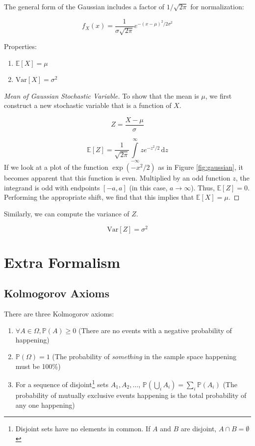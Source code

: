 \documentclass[13pt,oneside]{tufte-book}
\providecommand{\tightlist}{%
  \setlength{\itemsep}{0pt}\setlength{\parskip}{0pt}}
\theoremstyle{definition}
\theoremstyle{definition}
\theoremstyle{definition}
\theoremstyle{remark}
\let\BeginKnitrBlock\begin \let\EndKnitrBlock\end
\begin{document}
The general form of the Gaussian includes a factor of \(1/\sqrt{2\pi}\)
for normalization:

\[
f_X(x) = \frac{1}{\sigma\sqrt{2\pi}}e^{-(x-\mu)^2/2\sigma^2}
\]

Properties:

\begin{enumerate}
\def\labelenumi{\arabic{enumi}.}
\tightlist
\item
  \(\mathbb{E}[X] = \mu\)
\item
  \(\mathrm{Var}[X] = \sigma^2\)
\end{enumerate}

\BeginKnitrBlock{proof}[Mean of Gaussian Stochastic Variable]
{} To
show that the mean is \(\mu\), we first construct a new stochastic
variable that is a function of \(X\).

\[
Z  = \frac{X-\mu}{\sigma}
\]

\[
\mathbb{E}[Z] = \frac{1}{\sqrt{2\pi}}\int\limits_{-\infty}^{\infty}ze^{-z^2/2}\,\mathrm{d}z
\] If we look at a plot of the function \(\exp(-x^2/2)\) as in Figure
\ref{fig:gaussian}, it becomes apparent that this function is even.
Multiplied by an odd function \(z\), the integrand is odd with endpoints
\([-a,a]\) (in this case, \(a \to \infty\)). Thus, \(\mathbb{E}[Z]=0\).
Performing the appropriate shift, we find that this implies that
\(\mathbb{E}[X] = \mu\).
\EndKnitrBlock{proof}

Similarly, we can compute the variance of \(Z\).

\[
\mathrm{Var}[Z] = \sigma^2
\]

\chapter{Extra Formalism}\label{extra-formalism}

\hypertarget{kmaxm}{\section{Kolmogorov Axioms}\label{kmaxm}}

There are three Kolmogorov axioms:

\begin{enumerate}
\def\labelenumi{\arabic{enumi}.}
\item
  \(\forall A \in \Omega, \mathbb{P}(A) \geq 0\) (There are no events
  with a negative probability of happening)
\item
  \(\mathbb{P}(\Omega) = 1\) (The probability of \emph{something} in the
  sample space happening must be 100\%)
\item
  For a sequence of disjoint\footnote{Disjoint sets have no elements in
    common. If \(A\) and \(B\) are disjoint, \(A \cap B = \emptyset\)}
  sets \(A_1, A_2, \dots\),
  \(\mathbb{P}\left( \bigcup_i A_i \right) = \sum_i \mathbb{P}(A_i)\)
  (The probability of mutually exclusive events happening is the total
  probability of any one happening)
\end{enumerate}
\end{document}
